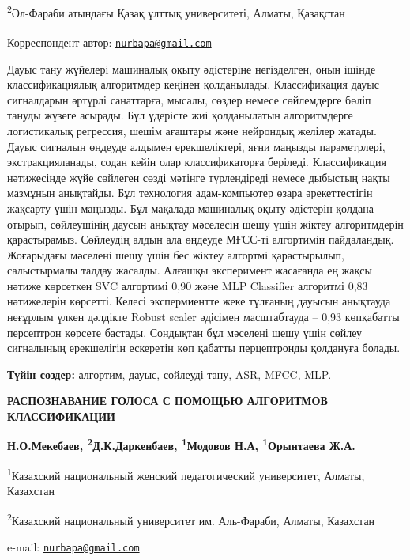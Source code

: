 \textsuperscript{2}Әл-Фараби атындағы Қазақ ұлттық университеті, Алматы,
Қазақстан

{\bfseries \textsuperscript{\envelope }}Корреспондент-автор:
\href{mailto:nurbapa@gmail.com}{\nolinkurl{nurbapa@gmail.com}}

Дауыс тану жүйелері машиналық оқыту әдістеріне негізделген, оның ішінде
классификациялық алгоритмдер кеңінен қолданылады. Классификация дауыс
сигналдарын әртүрлі санаттарға, мысалы, сөздер немесе сөйлемдерге бөліп
тануды жүзеге асырады. Бұл үдерісте жиі қолданылатын алгоритмдерге
логистикалық регрессия, шешім ағаштары және нейрондық желілер жатады.
Дауыс сигналын өңдеуде алдымен ерекшеліктері, яғни маңызды параметрлері,
экстракцияланады, содан кейін олар классификаторға беріледі.
Классификация нәтижесінде жүйе сөйлеген сөзді мәтінге түрлендіреді
немесе дыбыстың нақты мазмұнын анықтайды. Бұл технология адам-компьютер
өзара әрекеттестігін жақсарту үшін маңызды. Бұл мақалада машиналық оқыту
әдістерін қолдана отырып, сөйлеушінің даусын анықтау мәселесін шешу үшін
жіктеу алгоритмдерін қарастырамыз. Сөйлеудің алдын ала өңдеуде МҒСС-ті
алгортимін пайдаландық. Жоғарыдағы мәселені шешу үшін бес жіктеу
алгортмі қарастырылып, салыстырмалы талдау жасалды. Алғашқы эксперимент
жасағанда ең жақсы нәтиже көрсеткен SVC алгортимі 0,90 және MLP
Classifier алгоритмі 0,83 нәтижелерін көрсетті. Келесі экспермиентте
жеке тұлғаның дауысын анықтауда неғұрлым үлкен дәлдікте Robust scaler
әдісімен масштабтауда -- 0,93 көпқабатты персептрон көрсете бастады.
Сондықтан бұл мәселені шешу үшін сөйлеу сигналының ерекшелігін ескеретін
көп қабатты перцептронды қолдануға болады.

{\bfseries Түйін сөздер:} алгортим, дауыс, сөйлеуді тану, ASR, MFCC, MLP.

{\bfseries РАСПОЗНАВАНИЕ ГОЛОСА С ПОМОЩЬЮ АЛГОРИТМОВ КЛАССИФИКАЦИИ}

{\bfseries \textsuperscript{}Н.О.Мекебаев,
\textsuperscript{2}Д.К.Даркенбаев, \textsuperscript{1}Модовов Н.А,
\textsuperscript{1}Орынтаева Ж.А.}

\textsuperscript{1}Казахский национальный женский педагогический
университет, Алматы, Казахстан

\textsuperscript{2}Казахский национальный университет им. Аль-Фараби,
Алматы, Казахстан

e-mail: \href{mailto:nurbapa@gmail.com}{\nolinkurl{nurbapa@gmail.com}}

